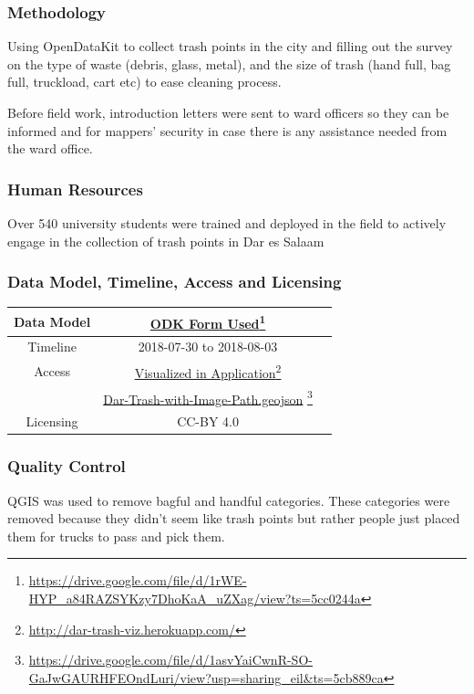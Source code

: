 \documentclass[a4paper,12pt,twoside]{article}
\begin{document}
\subsubsection{Methodology}
Using OpenDataKit to collect trash points in the city and filling out the survey on the type of waste (debris, glass, metal), and the size of trash (hand full, bag full, truckload, cart etc) to ease cleaning process.

Before field work, introduction letters were sent to ward officers so they can be informed and for mappers’ security in case there is any assistance needed from the ward office.

\subsubsection{Human Resources}
Over 540 university students were trained and deployed in the field to actively engage in the collection of trash points in Dar es Salaam

\subsubsection{Data Model, Timeline, Access and Licensing}
\begin{center}
\begin{tabular}{|c|c|c|}  

 \hline
Data Model &
\href{https://drive.google.com/file/d/1rWE-HYP_a84RAZSYKzy7DhoKaA_uZXag/view?ts=5cc0244a}{ODK Form Used}\footnote{\url{https://drive.google.com/file/d/1rWE-HYP_a84RAZSYKzy7DhoKaA_uZXag/view?ts=5cc0244a}} \\
 \hline
  Timeline  &  2018-07-30 to 2018-08-03 \\
\hline  
Access & {\href{http://dar-trash-viz.herokuapp.com/}{Visualized in Application}\footnote{\url{http://dar-trash-viz.herokuapp.com/}}}\\
{} & {\href{https://drive.google.com/file/d/1asvYaiCwnR-SO-GaJwGAURHFEOndLuri/view?usp=sharing_eil&ts=5cb889ca}{Dar-Trash-with-Image-Path.geojson} \footnote{\url{https://drive.google.com/file/d/1asvYaiCwnR-SO-GaJwGAURHFEOndLuri/view?usp=sharing_eil&ts=5cb889ca}}}\\
\hline
Licensing & CC-BY 4.0\\
\hline

\end{tabular}
\end{center}

\subsubsection{Quality Control}
QGIS was used to remove bagful and handful categories.
These categories were removed because they didn't seem like trash points but rather people just placed them for trucks to pass and pick them.
\end{document}
